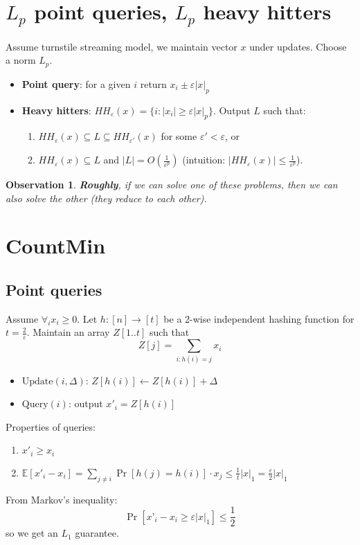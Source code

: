 \documentclass[11pt]{article}
\newtheorem{observation}[theorem]{Observation}
\newcommand{\E}{{\mathbb E}}
\begin{document}
\section{$L_p$ point queries, $L_p$ heavy hitters}
Assume turnstile streaming model, we maintain vector $x$ under updates. Choose a norm $L_p$.
\begin{itemize}
\item \textbf{Point query}: for a given $i$ return $x_i \pm \varepsilon |x|_p$
\item \textbf{Heavy hitters}: $HH_\varepsilon(x) = \{ i: |x_i| \ge \varepsilon |x|_p\}$. Output $L$ such that:
\begin{enumerate}
\item $HH_\varepsilon(x) \subseteq L \subseteq HH_{\varepsilon'}(x)$ for some $\varepsilon' < \varepsilon$, or
\item $HH_\varepsilon(x) \subseteq L$ and $|L| = O(\frac{1}{\varepsilon^p})$ (intuition: $|HH_\varepsilon(x)| \le \frac{1}{\varepsilon^p}$).
\end{enumerate}
\end{itemize}
\begin{observation}
\textbf{Roughly}, if we can solve one of these problems, then we can also solve the other (they reduce to each other).
\end{observation}
\section{CountMin \cite{DBLP:conf/latin/CormodeM04}}
\subsection{Point queries}
Assume $\forall_i x_i \ge 0$. Let $h:[n]\to[t]$ be a 2-wise independent hashing function for $t=\frac{2}{\varepsilon}$. Maintain an array $Z[1..t]$ such that $$Z[j]=\sum_{i: h(i) = j} x_i$$
\begin{itemize}
\item $\text{Update}(i, \Delta)$: $Z[h(i)] \leftarrow Z[h(i)] + \Delta$
\item $\text{Query}(i)$: output $x'_i = Z[h(i)]$
\end{itemize}
Properties of queries:
\begin{enumerate}
\item $x'_i \ge x_i$
\item $\E[x'_i - x_i] = \sum_{j \neq i} \Pr[h(j) = h(i)] \cdot x_j \le \frac{1}{t}|x|_1 = \frac{\varepsilon}{2}|x|_1$
\end{enumerate}
From Markov's inequality: $$\Pr[x’_i - x_i \ge \varepsilon |x|_1] \le \frac{1}{2}$$
so we get an $L_1$ guarantee.
\end{document}
